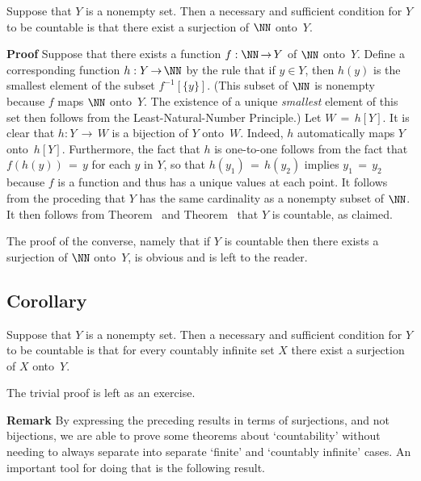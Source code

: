 \V

        Suppose that $Y$ is a nonempty set. Then a necessary and sufficient condition
    for $Y$ to be countable is that there exist a surjection of ${\NN}$ onto~$Y$.


\V

        {\bf Proof} Suppose that there exists a function $f:{\NN} \,{\rightarrow}\, Y$ of ${\NN}$ onto~$Y$.
    Define a corresponding function $h:Y \,{\rightarrow}\, {\NN}$ by the rule that if $y{\in}Y$,
    then $h(y)$ is the smallest element of the subset $f^{-1}[\{y\}]$. (This subset of ${\NN}$ is nonempty because $f$ maps ${\NN}$ onto~$Y$.
    The existence of a unique {\em smallest} element of this set then follows from the Least-Natural-Number Principle.)
    Let $W \,=\, h[Y]$. It is clear that $h:Y \,{\rightarrow}\, W$ is a bijection of $Y$ onto~$W$. Indeed, $h$ automatically maps $Y$ onto~$h[Y]$.
    Furthermore, the fact that $h$ is one-to-one follows from the fact that $f(h(y)) \,=\, y$ for each $y$ in $Y$,
    so that $h(y_{1}) \,=\, h(y_{2})$ implies $y_{1} \,=\, y_{2}$ because $f$ is a function and thus has a unique values at each point.
    It follows from the proceding that $Y$ has the same cardinality as a nonempty subset of ${\NN}$.
    It then follows from Theorem~ and Theorem~ that $Y$ is countable, as claimed.

        The proof of the converse, namely that if $Y$ is countable then there exists a surjection of ${\NN}$ onto~$Y$, is obvious and is left to the reader.

\V

            \subsection{\small{\bf Corollary}}
            \label{CorA20.25B}

\V

        Suppose that $Y$ is a nonempty set. Then a necessary and sufficient condition
    for $Y$ to be countable is that for every countably infinite set $X$ there exist a surjection of $X$ onto~$Y$.

\V

        The trivial proof is left as an exercise.

\VV

        {\bf Remark} By expressing the preceding results in terms of surjections, and not bijections,
    we are able to prove some theorems about `countability' without needing to always separate into separate `finite' and `countably infinite' cases.
    An important tool for doing that is the following result.


